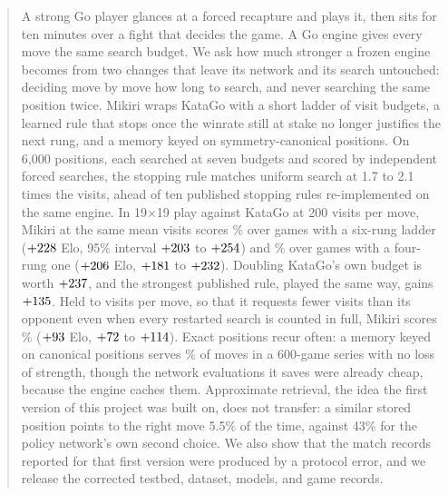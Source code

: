 \begin{abstract}
A strong Go player glances at a forced recapture and plays it, then sits for ten minutes over a fight that decides the game. A Go engine gives every move the same search budget. We ask how much stronger a frozen engine becomes from two changes that leave its network and its search untouched: deciding move by move how long to search, and never searching the same position twice. Mikiri wraps KataGo with a short ladder of visit budgets, a learned rule that stops once the winrate still at stake no longer justifies the next rung, and a memory keyed on symmetry-canonical positions. On 6{,}000 positions, each searched at seven budgets and scored by independent forced searches, the stopping rule matches uniform search at 1.7 to 2.1 times the visits, ahead of ten published stopping rules re-implemented on the same engine. In 19$\times$19 play against KataGo at 200 visits per move, Mikiri at the same mean visits scores \longScore\% over \longGames{} games with a six-rung ladder ($\longElo$ Elo, 95\% interval $\longEloLo$ to $\longEloHi$) and \mainScore\% over \mainGames{} games with a four-rung one ($\mainElo$ Elo, $\mainEloLo$ to $\mainEloHi$). Doubling KataGo's own budget is worth $\unidoubleElo$, and the strongest published rule, played the same way, gains $\vmctsElo$. Held to \strictVisits{} visits per move, so that it requests fewer visits than its opponent even when every restarted search is counted in full, Mikiri scores \strictScore\% ($\strictElo$ Elo, $\strictEloLo$ to $\strictEloHi$). Exact positions recur often: a memory keyed on canonical positions serves \memonlyHitRate\% of moves in a 600-game series with no loss of strength, though the network evaluations it saves were already cheap, because the engine caches them. Approximate retrieval, the idea the first version of this project was built on, does not transfer: a similar stored position points to the right move 5.5\% of the time, against 43\% for the policy network's own second choice. We also show that the match records reported for that first version were produced by a protocol error, and we release the corrected testbed, dataset, models, and game records.
\end{abstract}
